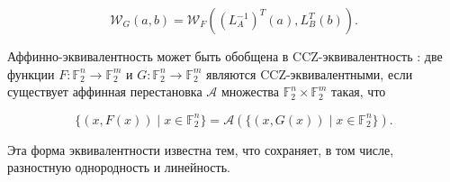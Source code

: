 \[
\mathcal{W}_G(a, b) = \mathcal{W}_F((L_A^{-1})^T(a), L_B^T(b)).
\]

Аффинно-эквивалентность может быть обобщена в CCZ-эквивалентность \cite{CCZ98}: две функции \( F: \mathbb{F}_2^n \rightarrow \mathbb{F}_2^m \) и \( G: \mathbb{F}_2^n \rightarrow \mathbb{F}_2^m \) являются CCZ-эквивалентными, если существует аффинная перестановка \( \mathcal{A} \) множества \(\mathbb{F}_2^n \times \mathbb{F}_2^m\) такая, что

\[
\{(x, F(x)) \mid x \in \mathbb{F}_2^n \} = \mathcal{A}(\{(x, G(x)) \mid x \in \mathbb{F}_2^n \}).
\]

Эта форма эквивалентности известна тем, что сохраняет, в том числе, разностную однородность и линейность.
